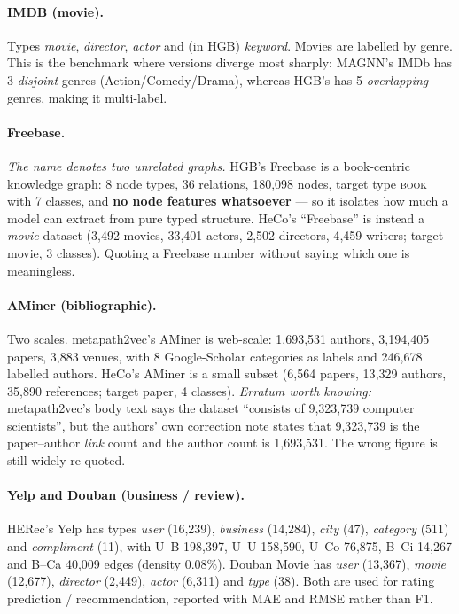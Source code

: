 \paragraph{IMDB (movie).} Types \emph{movie}, \emph{director}, \emph{actor} and (in HGB)
\emph{keyword}. Movies are labelled by genre. This is the benchmark where versions diverge most
sharply: MAGNN's IMDb has 3 \emph{disjoint} genres (Action/Comedy/Drama), whereas HGB's has 5
\emph{overlapping} genres, making it multi-label.

\paragraph{Freebase.} \emph{The name denotes two unrelated graphs.} HGB's Freebase is a
book-centric knowledge graph: 8 node types, 36 relations, 180{,}098 nodes, target type
\textsc{book} with 7 classes, and \textbf{no node features whatsoever} --- so it isolates how much
a model can extract from pure typed structure. HeCo's ``Freebase'' is instead a \emph{movie}
dataset (3{,}492 movies, 33{,}401 actors, 2{,}502 directors, 4{,}459 writers; target movie, 3
classes). Quoting a Freebase number without saying which one is meaningless.

\paragraph{AMiner (bibliographic).} Two scales. metapath2vec's AMiner is web-scale: 1{,}693{,}531
authors, 3{,}194{,}405 papers, 3{,}883 venues, with 8 Google-Scholar categories as labels and
246{,}678 labelled authors. HeCo's AMiner is a small subset (6{,}564 papers, 13{,}329 authors,
35{,}890 references; target paper, 4 classes). \emph{Erratum worth knowing:} metapath2vec's body
text says the dataset ``consists of 9{,}323{,}739 computer scientists'', but the authors' own
correction note states that 9{,}323{,}739 is the paper--author \emph{link} count and the author
count is 1{,}693{,}531. The wrong figure is still widely re-quoted.

\paragraph{Yelp and Douban (business / review).} HERec's Yelp has types \emph{user} (16{,}239),
\emph{business} (14{,}284), \emph{city} (47), \emph{category} (511) and \emph{compliment} (11),
with U--B 198{,}397, U--U 158{,}590, U--Co 76{,}875, B--Ci 14{,}267 and B--Ca 40{,}009 edges
(density $0.08\%$). Douban Movie has \emph{user} (13{,}367), \emph{movie} (12{,}677),
\emph{director} (2{,}449), \emph{actor} (6{,}311) and \emph{type} (38). Both are used for
rating prediction / recommendation, reported with MAE and RMSE rather than F1.

